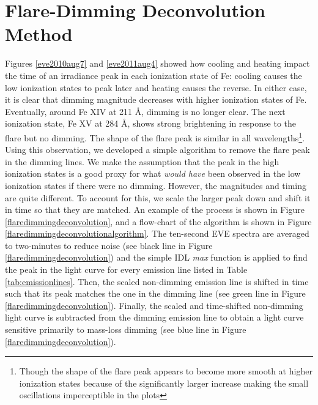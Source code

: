 \section{Flare-Dimming Deconvolution Method}
\label{sec:deconvolve}
Figures \ref{eve2010aug7} and \ref{eve2011aug4} showed how cooling and heating impact the time of an irradiance peak in each ionization state of Fe: cooling causes the low ionization states to peak later and heating causes the reverse. In either case, it is clear that dimming magnitude decreases with higher ionization states of Fe. Eventually, around Fe XIV at 211 \AA, dimming is no longer clear. The next ionization state, Fe XV at 284 \AA, shows strong brightening in response to the flare but no dimming. The shape of the flare peak is similar in all wavelengths\footnote{Though the shape of the flare peak appears to become more smooth at higher ionization states because of the significantly larger increase making the small oscillations imperceptible in the plots}. Using this observation, we developed a simple algorithm to remove the flare peak in the dimming lines. We make the assumption that the peak in the high ionization states is a good proxy for what \textit{would have} been observed in the low ionization states if there were no dimming. However, the magnitudes and timing are quite different. To account for this, we scale the larger peak down and shift it in time so that they are matched. An example of the process is shown in Figure \ref{flaredimmingdeconvolution}, and a flow-chart of the algorithm is shown in Figure \ref{flaredimmingdeconvolutionalgorithm}. The ten-second EVE spectra are averaged to two-minutes to reduce noise (see black line in Figure \ref{flaredimmingdeconvolution}) and the simple IDL \textit{max} function is applied to find the peak in the light curve for every emission line listed in Table \ref{tab:emissionlines}. Then, the scaled non-dimming emission line is shifted in time such that its peak matches the one in the dimming line (see green line in Figure \ref{flaredimmingdeconvolution}). Finally, the scaled and time-shifted non-dimming light curve is subtracted from the dimming emission line to obtain a light curve sensitive primarily to mass-loss dimming (see blue line in Figure \ref{flaredimmingdeconvolution}). 

